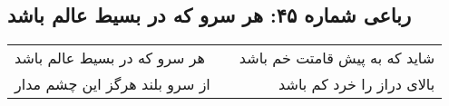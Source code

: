 \begin{center}
\section*{رباعی شماره ۴۵: هر سرو که در بسیط عالم باشد}
\label{sec:045}
\begin{longtable}{l p{0.5cm} r}
هر سرو که در بسیط عالم باشد
&&
شاید که به پیش قامتت خم باشد
\\
از سرو بلند هرگز این چشم مدار
&&
بالای دراز را خرد کم باشد
\\
\end{longtable}
\end{center}
